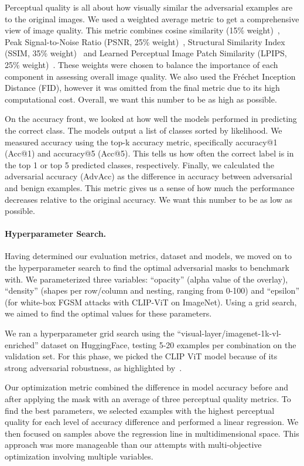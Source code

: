 \documentclass[a4paper, oneside]{discothesis}
\begin{document}
Perceptual quality is all about how visually similar the adversarial examples are to the original images. We used a weighted average metric to get a comprehensive view of image quality. This metric combines cosine similarity (15\% weight)~\cite{singhal2001modern}, Peak Signal-to-Noise Ratio (PSNR, 25\% weight)~\cite{9311108}, Structural Similarity Index (SSIM, 35\% weight)~\cite{wang2004image} and Learned Perceptual Image Patch Similarity (LPIPS, 25\% weight)~\cite{lpips}. These weights were chosen to balance the importance of each component in assessing overall image quality. We also used the Fréchet Inception Distance (FID), however it was omitted from the final metric due to its high computational cost. Overall, we want this number to be as high as possible.

On the accuracy front, we looked at how well the models performed in predicting the correct class. The models output a list of classes sorted by likelihood. We measured accuracy using the top-k accuracy metric, specifically accuracy@1 (Acc@1) and accuracy@5 (Acc@5). This tells us how often the correct label is in the top 1 or top 5 predicted classes, respectively. Finally, we calculated the adversarial accuracy (AdvAcc) as the difference in accuracy between adversarial and benign examples. This metric gives us a sense of how much the performance decreases relative to the original accuracy. We want this number to be as low as possible.

\paragraph{Hyperparameter Search.}

Having determined our evaluation metrics, dataset and models, we moved on to the hyperparameter search to find the optimal adversarial masks to benchmark with. We parameterized three variables: ``opacity'' (alpha value of the overlay), ``density'' (shapes per row/column and nesting, ranging from 0-100) and ``epsilon'' (for white-box FGSM attacks with CLIP-ViT on ImageNet). Using a grid search, we aimed to find the optimal values for these parameters.

We ran a hyperparameter grid search using the ``visual-layer/imagenet-1k-vl-enriched'' dataset on HuggingFace, testing 5-20 examples per combination on the validation set. For this phase, we picked the CLIP ViT model because of its strong adversarial robustness, as highlighted by~\cite{wang2024roz}.

Our optimization metric combined the difference in model accuracy before and after applying the mask with an average of three perceptual quality metrics. To find the best parameters, we selected examples with the highest perceptual quality for each level of accuracy difference and performed a linear regression. We then focused on samples above the regression line in multidimensional space. This approach was more manageable than our attempts with multi-objective optimization involving multiple variables.
\end{document}
